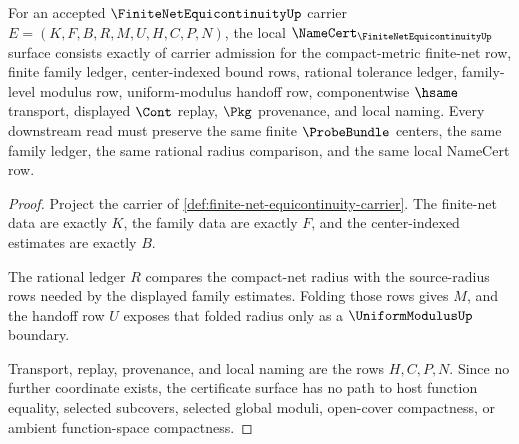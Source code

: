 \begin{theorem}
\label{thm:finite-net-equicontinuity-obligation-surface}
For an accepted $\FiniteNetEquicontinuityUp$ carrier $E=(K,F,B,R,M,U,H,C,P,N)$, the local $\NameCert_{\FiniteNetEquicontinuityUp}$ surface consists exactly of carrier admission for the compact-metric finite-net row, finite family ledger, center-indexed bound rows, rational tolerance ledger, family-level modulus row, uniform-modulus handoff row, componentwise $\hsame$ transport, displayed $\Cont$ replay, $\Pkg$ provenance, and local naming. Every downstream read must preserve the same finite $\ProbeBundle$ centers, the same family ledger, the same rational radius comparison, and the same local NameCert row.
\end{theorem}
\begin{proof}
Project the carrier of \autoref{def:finite-net-equicontinuity-carrier}. The finite-net data are exactly $K$, the family data are exactly $F$, and the center-indexed estimates are exactly $B$.

The rational ledger $R$ compares the compact-net radius with the source-radius rows needed by the displayed family estimates. Folding those rows gives $M$, and the handoff row $U$ exposes that folded radius only as a $\UniformModulusUp$ boundary.

Transport, replay, provenance, and local naming are the rows $H,C,P,N$. Since no further coordinate exists, the certificate surface has no path to host function equality, selected subcovers, selected global moduli, open-cover compactness, or ambient function-space compactness.
\end{proof}

